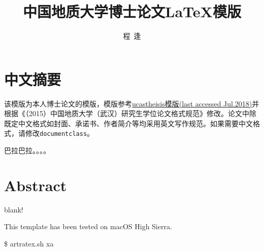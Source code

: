 \title{中国地质大学博士论文\LaTeX{}模版}%
\author{程~逢}%
\advisorsec{}%
\maketitle%
\makeenglishtitle%
\makedeclaration%
\linespread{1.67} \selectfont

\chapter*{中文摘要}%
{
\setlength{\parindent}{2em}
\hspace{2\ccwd}该模版为本人博士论文的模版，模版参考\href{https://github.com/mohuangrui/ucasthesis}{ucastheisis模版(last accessed Jul.2018)}并根据《（2015）中国地质大学（武汉）研究生学位论文格式规范》修改。论文中除既定中文格式如封面、承诺书、作者简介等均采用英文写作规范。如果需要中文格式，请修改\verb|documentclass|。

巴拉巴拉。。。。
}

\chapter*{Abstract}%
blank!

This template has been tested on macOS High Sierra.

\$ artratex.sh xa





